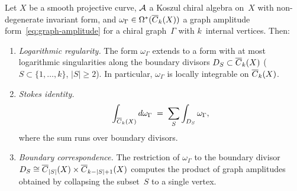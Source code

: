 \begin{proposition}\label{prop:stokes-regularity-FM}
Let $X$ be a smooth projective curve, $\mathcal{A}$ a Koszul chiral algebra
on~$X$ with non-degenerate invariant form, and
$\omega_\Gamma \in \Omega^*(\overline{C}_{k}(X))$
a graph amplitude form~\eqref{eq:graph-amplitude} for a chiral
graph~$\Gamma$ with $k$~internal vertices.  Then:
\begin{enumerate}[label=\textup{(\alph*)}]
\item \emph{Logarithmic regularity.}
  The form $\omega_\Gamma$ extends to a form with at most logarithmic
  singularities along the boundary divisors $D_S \subset
  \overline{C}_{k}(X)$
  \textup{(}$S \subset \{1,\ldots,k\}$, $|S|\geq 2$\textup{)}.
  In particular, $\omega_\Gamma$ is locally integrable on
  $\overline{C}_{k}(X)$.
\item \emph{Stokes identity.}
  \begin{equation}\label{eq:stokes-FM}
  \int_{\overline{C}_{k}(X)} d\omega_\Gamma
  \;=\;
  \sum_{S} \int_{D_S} \omega_\Gamma,
  \end{equation}
  where the sum runs over boundary divisors.
\item \emph{Boundary correspondence.}
  The restriction of $\omega_\Gamma$ to the boundary divisor
  $D_S \cong \overline{C}_{|S|}(X) \times \overline{C}_{k-|S|+1}(X)$
  computes the product of graph amplitudes obtained by collapsing
  the subset~$S$ to a single vertex.
\end{enumerate}
\end{proposition}

